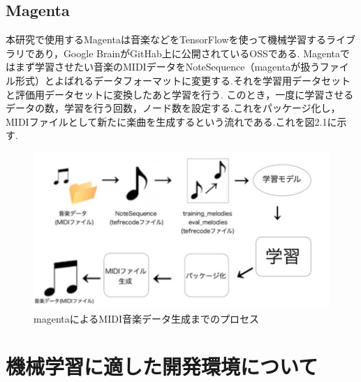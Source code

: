 \subsection{Magenta}
本研究で使用するMagentaは音楽などをTensorFlowを使って機械学習するライブラリであり，Google BrainがGitHab上に公開されているOSSである.
Magentaではまず学習させたい音楽のMIDIデータをNoteSequence（magentaが扱うファイル形式）とよばれるデータフォーマットに変更する.それを学習用データセットと評価用データセットに変換したあと学習を行う.
このとき，一度に学習させるデータの数，学習を行う回数，ノード数を設定する.これをパッケージ化し，MIDIファイルとして新たに楽曲を生成するという流れである.これを図2.1に示す.
\newpage
\begin{figure}[h]
    \begin{screen}
    \begin{center}
        \includegraphics[scale=1.7, clip]{./img/magenta_usestep.png}
        \caption{magentaによるMIDI音楽データ生成までのプロセス}
        \label{fig:magentaによるMIDI音楽データ生成までのプロセス}
    \end{center}
    \end{screen}
\end{figure}
\section{機械学習に適した開発環境について}
